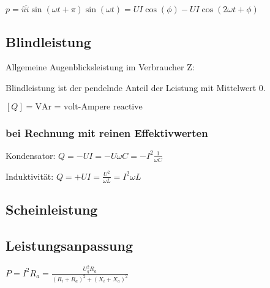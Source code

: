 \documentclass[10pt,a4paper]{scrartcl}
\begin{document}
\begin{multicols*}{3}
	$p=\hat{u}\hat{i}\sin(\omega t +\pi)\sin(\omega t)=UI\cos(\phi)-UI\cos(2\omega t +\phi)$
	
	
	
	\subsection{Blindleistung}
	
	Allgemeine Augenblicksleistung im Verbraucher Z:
	
	
	Blindleistung ist der pendelnde Anteil der Leistung mit Mittelwert 0.
	
	
	$[Q]=\text{VAr = volt-Ampere reactive}$
	
	 
	
	\subsubsection{bei Rechnung mit reinen Effektivwerten}
	
	Kondensator: $Q=-UI=-U\omega C=-I^2\frac{1}{\omega C}$
	
	Induktivität: $Q = +UI=\frac{U^2}{\omega L}=I^2\omega L$
	
	 
	
	\subsection{Scheinleistung}
	
	
	
	
	\columnbreak
	
	\subsection{Leistungsanpassung}
	
	
	$P=I^2R_a=\frac{U_q^2R_a}{(R_i+R_a)^2+(X_i+X_a)^2}$
	

\end{multicols*}
\end{document}
